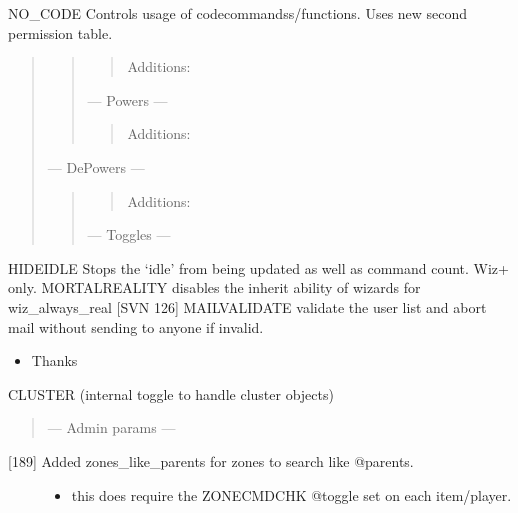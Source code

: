 \documentclass[letterpaper,10pt,english]{sphinxmanual}
\begin{document}
\sphinxAtStartPar
NO\_CODE  \sphinxhyphen{} Controls usage of code\sphinxhyphen{}commandss/functions.  Uses new second permission table.
\begin{quote}
\begin{quote}
\begin{quote}

\sphinxAtStartPar
Additions:
\end{quote}

\sphinxAtStartPar
— Powers —
\begin{quote}

\sphinxAtStartPar
Additions:
\end{quote}
\end{quote}

\sphinxAtStartPar
— De\sphinxhyphen{}Powers —
\begin{quote}
\begin{quote}

\sphinxAtStartPar
Additions:
\end{quote}

\sphinxAtStartPar
— Toggles —
\end{quote}
\end{quote}

\sphinxAtStartPar
HIDEIDLE \sphinxhyphen{} Stops the ‘idle’ from being updated as well as command count.  Wiz+ only.
MORTALREALITY \sphinxhyphen{} disables the inherit ability of wizards for wiz\_always\_real {[}SVN 126{]}
MAILVALIDATE \sphinxhyphen{} validate the user list and abort mail without sending to anyone if invalid.
\begin{itemize}
\item {} 
\sphinxAtStartPar
Thanks 

\end{itemize}

\sphinxAtStartPar
CLUSTER \sphinxhyphen{} (internal toggle to handle cluster objects)
\begin{quote}

\sphinxAtStartPar
— Admin params —
\end{quote}
\begin{description}
\item[{{[}18\sphinxhyphen{}9{]} Added zones\_like\_parents for zones to search like @parents.}] \leavevmode\begin{itemize}
\item {} 
\sphinxAtStartPar
this does require the ZONECMDCHK @toggle set on each item/player.

\end{itemize}

\end{description}
\end{document}
